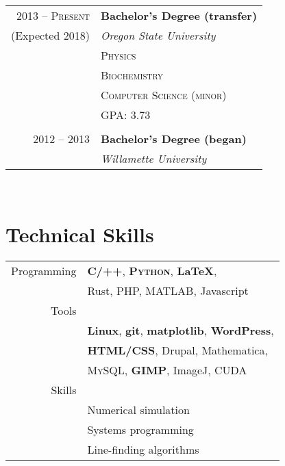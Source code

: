 \documentclass[10pt]{article} %
\begin{document}
{\begin{minipage}[t]{0.44\textwidth}
\begin{tabular}{rl} %


2013 -- \textsc{Present} & \textbf{Bachelor's Degree (transfer)} \\
(Expected 2018)& \textit{Oregon State University}\\
& \textsc{Physics}\\
& \textsc{Biochemistry}\\
& \textsc{Computer Science (minor)}\\
& GPA: 3.73\\ \\

2012 -- 2013 & \textbf{Bachelor's Degree (began)} \\ 
& \textit{Willamette University}\\
	

\end{tabular}\\[10pt]


\section{Technical Skills} 

\begin{tabular}{rl}
  Programming
  & \textbf{\textsc{C/++}}, \textbf{\textsc{Python}}, \textbf{\LaTeX},\\
  & Rust, PHP, MATLAB, Javascript\\
  Tools\\
  & \textbf{Linux}, \textbf{git}, \textbf{matplotlib}, \textbf{WordPress},\\
  & \textbf{HTML/CSS}, Drupal, Mathematica,\\
  & \textsc{MySQL}, \textbf{GIMP}, ImageJ, CUDA\\
  Skills\\
  &Numerical simulation\\
  &Systems programming\\
  &Line-finding algorithms\\
\end{tabular}\\


\end{minipage}}
\end{document}
